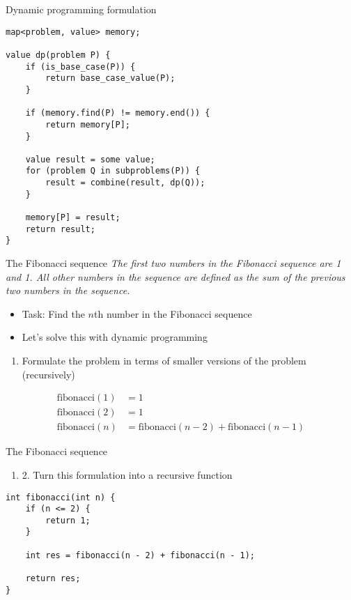 \documentclass[10pt]{beamer}
\newcommand{\bi}{\begin{itemize}}
\newcommand{\ei}{\end{itemize}}
\newcommand{\be}{\begin{enumerate}}
\newcommand{\ee}{\end{enumerate}}
\begin{document}
\begin{frame}[fragile]{Dynamic programming formulation}
    \begin{verbatim}
map<problem, value> memory;

value dp(problem P) {
    if (is_base_case(P)) {
        return base_case_value(P);
    }

    if (memory.find(P) != memory.end()) {
        return memory[P];
    }

    value result = some value;
    for (problem Q in subproblems(P)) {
        result = combine(result, dp(Q));
    }

    memory[P] = result;
    return result;
}
    \end{verbatim}
\end{frame}

\begin{frame}{The Fibonacci sequence}
    \vspace{5pt}
    \textit{The first two numbers in the Fibonacci sequence are 1 and 1. All
            other numbers in the sequence are defined as the sum of the previous two
            numbers in the sequence.}

    \vspace{5pt}
    \bi
        \item Task: Find the $n$th number in the Fibonacci sequence
        \item Let's solve this with dynamic programming
    \ei

    \vspace{5pt}
    \be
        \item Formulate the problem in terms of smaller versions of the problem (recursively)
    \ee

    \begin{align*}
        \mathrm{fibonacci}(1) &= 1\\
        \mathrm{fibonacci}(2) &= 1\\
        \mathrm{fibonacci}(n) &= \mathrm{fibonacci}(n - 2) + \mathrm{fibonacci}(n - 1)
    \end{align*}
\end{frame}

\begin{frame}[fragile]{The Fibonacci sequence}
    \be
        \item[2.] Turn this formulation into a recursive function
    \ee

    \begin{verbatim}
int fibonacci(int n) {
    if (n <= 2) {
        return 1;
    }

    int res = fibonacci(n - 2) + fibonacci(n - 1);

    return res;
}
    \end{verbatim}
\end{frame}
\end{document}
